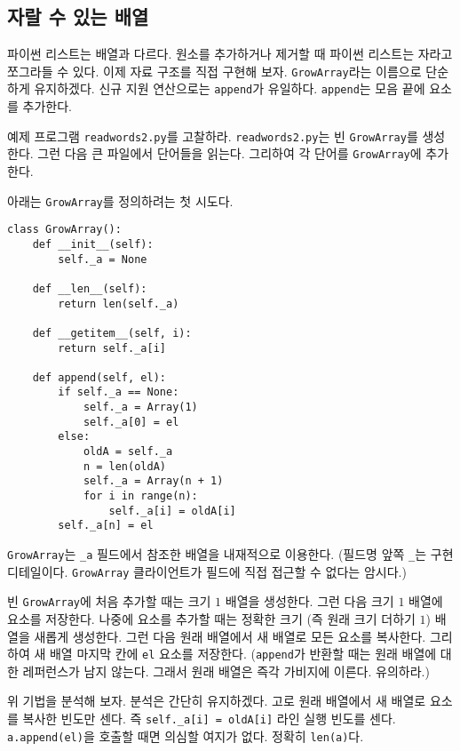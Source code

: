 \documentclass[a4paper]{oblivoir}
\begin{document}
\subsection*{자랄 수 있는 배열}

파이썬 리스트는 배열과 다르다. 원소를 추가하거나 제거할 때 파이썬 리스트는 자라고 쪼그라들 수 있다. 이제 자료 구조를 직접 구현해 보자. \texttt{GrowArray}라는 이름으로 단순하게 유지하겠다. 신규 지원 연산으로는 \texttt{append}가 유일하다. \texttt{append}는 모음 끝에 요소를 추가한다.

예제 프로그램 \texttt{readwords2.py}를 고찰하라. \texttt{readwords2.py}는 빈 \texttt{GrowArray}를 생성한다. 그런 다음 큰 파일에서 단어들을 읽는다. 그리하여 각 단어를 \texttt{GrowArray}에 추가한다. 

아래는 \texttt{GrowArray}를 정의하려는 첫 시도다.

\begin{verbatim}
class GrowArray():
    def __init__(self):
        self._a = None
        
    def __len__(self):
        return len(self._a)
        
    def __getitem__(self, i):
        return self._a[i]
        
    def append(self, el):
        if self._a == None:
            self._a = Array(1)
            self._a[0] = el
        else:
            oldA = self._a
            n = len(oldA)
            self._a = Array(n + 1)
            for i in range(n):
                self._a[i] = oldA[i]
        self._a[n] = el
\end{verbatim}

\noindent\texttt{GrowArray}는 \texttt{\_a} 필드에서 참조한 배열을 내재적으로 이용한다. (필드명 앞쪽 \texttt{\_}는 구현 디테일이다. \texttt{GrowArray} 클라이언트가 필드에 직접 접근할 수 없다는 암시다.)

빈 \texttt{GrowArray}에 처음 추가할 때는 크기 $1$ 배열을 생성한다. 그런 다음 크기 $1$ 배열에 요소를 저장한다. 나중에 요소를 추가할 때는 정확한 크기 (즉 원래 크기 더하기 $1$) 배열을 새롭게 생성한다. 그런 다음 원래 배열에서 새 배열로 모든 요소를 복사한다. 그리하여 새 배열 마지막 칸에 \texttt{el} 요소를 저장한다. (\texttt{append}가 반환할 때는 원래 배열에 대한 레퍼런스가 남지 않는다. 그래서 원래 배열은 즉각 가비지에 이른다. 유의하라.)

위 기법을 분석해 보자. 분석은 간단히 유지하겠다. 고로 원래 배열에서 새 배열로 요소를 복사한 빈도만 센다. 즉 \texttt{self.\_a[i] = oldA[i]} 라인 실행 빈도를 센다. \texttt{a.append(el)}을 호출할 때면 의심할 여지가 없다. 정확히 \texttt{len(a)}다.
\end{document}
